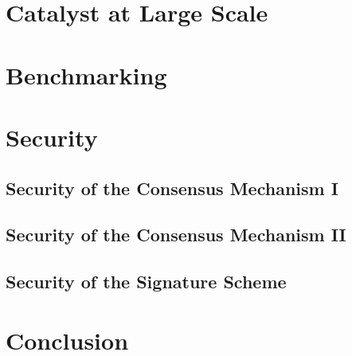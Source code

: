 \documentclass[a4paper, 12pt]{book}
\begin{document}



\chapter{Catalyst at Large Scale} \label{Cha:Sha}




\chapter{Benchmarking} \label{Cha:Ben}




\chapter{Security} \label{Cha:Sec}




\section{Security of the Consensus Mechanism I }\label{Sec:ConSec}



\section{Security of the Consensus Mechanism II }\label{Sec:SecLsu}




\section{Security of the Signature Scheme}\label{Sec:SSS}





\chapter*{Conclusion} \label{Cha:Con}




\printbibliography
\nocite{*}
\end{document}
